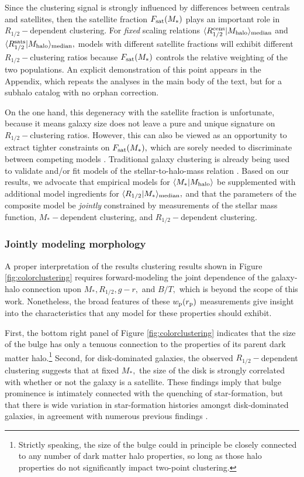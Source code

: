 \documentclass[usenatbib,usegraphicx,letterpaper]{mn2e}
\newcommand{\rhalf}{R_{1/2}}
\newcommand{\mstar}{M_{\ast}}
\newcommand{\mhalo}{M_{\rm halo}}
\newcommand{\rproj}{r_{\rm p}}
\newcommand{\wproj}{w_{\rm p}}
\newcommand{\mean}[2]{\langle{#1}\vert{#2}\rangle}
\newcommand{\median}[2]{\langle{#1}\vert{#2}\rangle_{\rm median}}
\begin{document}
Since the clustering signal is strongly influenced by differences between centrals and satellites, then the satellite fraction $F_{\rm sat}(\mstar)$ plays an important role in $\rhalf-$dependent clustering. For {\em fixed} scaling relations $\median{\rhalf^{\rm cens}}{\mhalo}$ and $\median{\rhalf^{\rm sats}}{\mhalo},$ models with different satellite fractions will exhibit different $\rhalf-$clustering ratios because $F_{\rm sat}(\mstar)$ controls the relative weighting of the two populations. An explicit demonstration of this point appears in the Appendix, which repeats the analyses in the main body of the text, but for a subhalo catalog with no orphan correction. 

On the one hand, this degeneracy with the satellite fraction is unfortunate, because it means galaxy size does not leave a pure and unique signature on $\rhalf-$clustering ratios. However, this can also be viewed as an opportunity to extract tighter constraints on $F_{\rm sat}(\mstar),$ which are sorely needed to discriminate between competing models \citep{watson_conroy13}. Traditional galaxy clustering is already being used to validate and/or fit models of the stellar-to-halo-mass relation \citep[e.g.,][]{leauthaud_etal11,moster_etal13,behroozi13_smhm,lehmann_etal15}. Based on our results, we advocate that empirical models for $\mean{\mstar}{\mhalo}$ be supplemented with additional model ingredients for $\median{\rhalf}{\mstar},$ and that the parameters of the composite model be {\em jointly} constrained by measurements of the stellar mass function, $\mstar-$dependent clustering, and $\rhalf-$dependent clustering. 

\subsubsection{Jointly modeling morphology}

A proper interpretation of the results clustering results shown in Figure \ref{fig:colorclustering} requires forward-modeling the joint dependence of the galaxy-halo connection upon $\mstar, \rhalf, g-r, $ and $B/T,$ which is beyond the scope of this work. Nonetheless, the broad features of these $\wproj(\rproj)$ measurements give insight into the characteristics that any model for these properties should exhibit. 

First, the bottom right panel of Figure \ref{fig:colorclustering} indicates that the size of the bulge has only a tenuous connection to the properties of its parent dark matter halo.\footnote{Strictly speaking, the size of the bulge could in principle be closely connected to any number of dark matter halo properties, so long as those halo properties do not significantly impact two-point clustering.} Second, for disk-dominated galaxies, the observed $\rhalf-$dependent clustering suggests that at fixed $\mstar,$ the size of the disk is strongly correlated with whether or not the galaxy is a satellite. These findings imply that bulge prominence is intimately connected with the quenching of star-formation, but that there is wide variation in star-formation histories amongst disk-dominated galaxies, in agreement with numerous previous findings \citep[see, e.g.,][]{woo_etal15,font_etal17}. 
\end{document}
